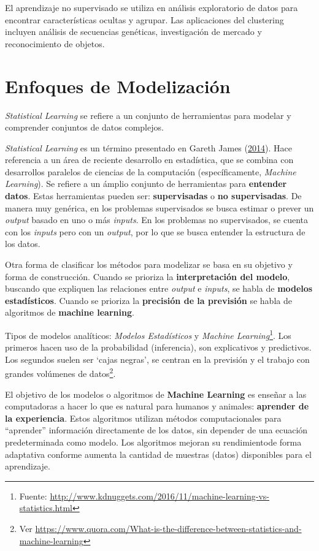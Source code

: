 \documentclass[]{book}
\let\rmarkdownfootnote\footnote%
\def\footnote{\protect\rmarkdownfootnote}
\begin{document}
El aprendizaje no supervisado se utiliza en análisis exploratorio de datos para encontrar características ocultas y agrupar. Las aplicaciones del clustering incluyen análisis de secuencias genéticas, investigación de mercado y reconocimiento de objetos.

\hypertarget{clasemodelos}{%
\section{Enfoques de Modelización}\label{clasemodelos}}

\emph{Statistical Learning} se refiere a un conjunto de herramientas para modelar y comprender conjuntos de datos complejos.

\emph{Statistical Learning} es un término presentado en Gareth James (\protect\hyperlink{ref-isl2014}{2014}). Hace referencia a un área de reciente desarrollo en estadística, que se combina con desarrollos paralelos de ciencias de la computación (específicamente, \emph{Machine Learning}). Se refiere a un ámplio conjunto de herramientas para \textbf{entender datos}. Estas herramientas pueden ser: \textbf{supervisadas} o \textbf{no supervisadas}. De manera muy genérica, en los problemas supervisados se busca estimar o prever un \emph{output} basado en uno o más \emph{inputs}. En los problemas no supervisados, se cuenta con los \emph{inputs} pero con un \emph{output}, por lo que se busca entender la estructura de los datos.

Otra forma de clasificar los métodos para modelizar se basa en su objetivo y forma de construcción. Cuando se prioriza la \textbf{interpretación del modelo}, buscando que expliquen las relaciones entre \emph{output} e \emph{inputs}, se habla de \textbf{modelos estadísticos}. Cuando se prioriza la \textbf{precisión de la previsión} se habla de algoritmos de \textbf{machine learning}.

Tipos de modelos analíticos: \emph{Modelos Estadísticos} y \emph{Machine Learning}\footnote{Fuente: \url{http://www.kdnuggets.com/2016/11/machine-learning-vs-statistics.html}}. Los primeros hacen uso de la probabilidad (inferencia), son explicativos y predictivos. Los segundos suelen ser `cajas negras', se centran en la previsión y el trabajo con grandes volúmenes de datos\footnote{Ver \url{https://www.quora.com/What-is-the-difference-between-statistics-and-machine-learning}}.

El objetivo de los modelos o algoritmos de \textbf{Machine Learning} es enseñar a las computadoras a hacer lo que es natural para humanos y animales: \textbf{aprender de la experiencia}. Estos algoritmos utilizan métodos computacionales para ``aprender'' información directamente de los datos, sin depender de una ecuación predeterminada como modelo. Los algoritmos mejoran su rendimientode forma adaptativa conforme aumenta la cantidad de muestras (datos) disponibles
para el aprendizaje.
\end{document}
